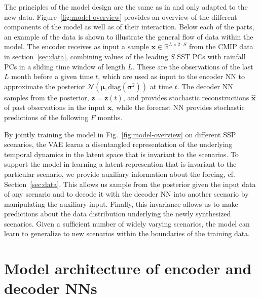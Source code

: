 \documentclass[english,a4paper,10pt]{scrartcl}
\begin{document}
The principles of the model design are the same as in \cite{Groth.precip-predict.2023} and only adapted to the new data. Figure~\ref{fig:model-overview} provides an overview of the different components of the model as well as of their interaction.  Below each of the parts, an example of the data is shown to illustrate the general flow of data within the model. The encoder receives as input a sample $\mathbf{x}\in\mathbb{R}^{L\times 2 \cdot S}$ from the CMIP data in section~\ref{sec:data}, combining values of the leading $S$ SST PCs with rainfall PCs in a sliding time window of length $L$. These are the observations of the last $L$ month before a given time $t$, which are used as input to the encoder NN to approximate the posterior $\mathcal{N}(\boldsymbol{\mu},\mathrm{diag}(\boldsymbol{\sigma}^{2}))$ at time $t$. The decoder NN samples from the posterior, $\mathbf{z}=\mathbf{z}(t)$, and provides stochastic reconstructions $\mathbf{\hat{x}}$ of past observations in the input $\mathbf{x}$, while the forecast NN provides stochastic predictions of the following $F$ months.

By jointly training the model in Fig.~\ref{fig:model-overview} on different SSP scenarios, the VAE learns a disentangled representation of the underlying temporal dynamics in the latent space that is invariant to the scenarios. To support the model in learning a latent represention that is invariant to the particular scenario, we provide auxiliary information about the forcing, cf. Section~\ref{sec:data}. This allows us sample from the posterior given the input data of any scenario and to decode it with the decoder NN into another scenario by manipulating the auxiliary input. Finally, this invariance allows us to make predictions about the data distribution underlying the newly synthesized scenarios. Given a sufficient number of widely varying scenarios, the model can learn to generalize to new scenarios within the boundaries of the training data.

\section{Model architecture of encoder and decoder NNs}\label{sec:model-architecture}
\end{document}
